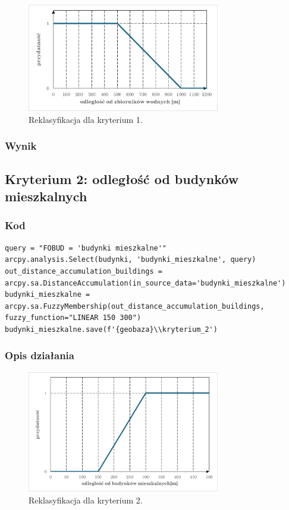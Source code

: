\documentclass{article}
\begin{document}
\begin{figure}[H]
    \centering
    \includegraphics[width=0.75\textwidth]{img/kryterium1-wykres-glowny.png}
    \caption*{Reklasyfikacja dla kryterium 1.}
\end{figure}
\subsubsection{Wynik}
\newpage
\subsection{Kryterium 2: odległość od budynków mieszkalnych}
\subsubsection{Kod}
\begin{lstlisting}
query = "FOBUD = 'budynki mieszkalne'"
arcpy.analysis.Select(budynki, 'budynki_mieszkalne', query)
out_distance_accumulation_buildings = arcpy.sa.DistanceAccumulation(in_source_data='budynki_mieszkalne')
budynki_mieszkalne = arcpy.sa.FuzzyMembership(out_distance_accumulation_buildings, fuzzy_function="LINEAR 150 300")
budynki_mieszkalne.save(f'{geobaza}\\kryterium_2')
\end{lstlisting}

\subsubsection{Opis działania}
\begin{figure}[H]
    \centering
    \includegraphics[width=0.75\textwidth]{img/kryterium2-wykres-glowny.png}
    \caption*{Reklasyfikacja dla kryterium 2.}
\end{figure}
\end{document}
